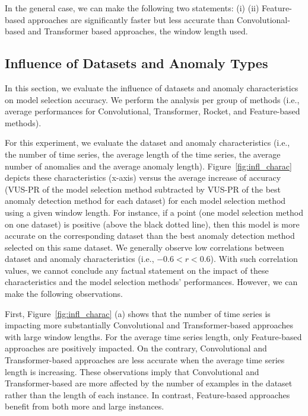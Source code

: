 In the general case, we can make the following two statements: (i)  (ii) Feature-based approaches are significantly faster but less accurate than Convolutional-based and Transformer based approaches,  the window length used.


\subsection{Influence of Datasets and Anomaly Types}
\label{exp:datasets}

In this section, we evaluate the influence of datasets and anomaly characteristics on model selection accuracy. We perform the analysis per group of methods (i.e., average performances for Convolutional, Transformer, Rocket, and Feature-based methods).

For this experiment, we evaluate the dataset and anomaly characteristics (i.e., the number of time series, the average length of the time series, the average number of anomalies and the average anomaly length). Figure~\ref{fig:infl_charac} depicts these characteristics (x-axis) versus the average increase of accuracy (VUS-PR of the model selection method subtracted by VUS-PR of the best anomaly detection method for each dataset) for each model selection method using a given window length. For instance, if a point (one model selection method on one dataset) is positive (above the black dotted line), then this model is more accurate on the corresponding dataset than the best anomaly detection method selected on this same dataset. %
We generally observe low correlations between dataset and anomaly characteristics (i.e., $-0.6<r<0.6$). With such correlation values, we cannot conclude any factual statement on the impact of these characteristics and the model selection methods' performances. However, we can make the following observations.

First, Figure~\ref{fig:infl_charac} (a) shows that the number of time series is impacting more substantially Convolutional and Transformer-based approaches with large window lengths. For the average time series length, only Feature-based approaches are positively impacted. On the contrary, Convolutional and Transformer-based approaches are less accurate when the average time series length is increasing. These observations imply that Convolutional and Transformer-based are more affected by the number of examples in the dataset rather than the length of each instance. In contrast, Feature-based approaches benefit from both more and large instances.

